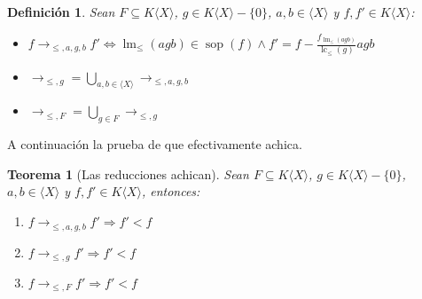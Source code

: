 \documentclass[12pt]{report}
\theoremstyle{customstyle}
\newtheorem{definition}{Definición}[chapter]
\newtheorem{theorem}{Teorema}[chapter]
\theoremstyle{factstyle}
\DeclareMathOperator{\sop}{sop}
\DeclareMathOperator{\lm}{lm}
\DeclareMathOperator{\lc}{lc}
\begin{document}
\begin{definition}
  Sean $F ⊆ K⟨X⟩$, $g ∈ K⟨X⟩ - \{0\}$, $a, b ∈ ⟨X⟩$ y $f, f' ∈ K⟨X⟩$:
  \begin{itemize}
    \item $f →_{≤, a, g, b} f' ⇔ \lm_≤(agb) ∈ \sop(f) ∧ f' = f - \frac{f_{\lm_≤(agb)}}{\lc_≤(g)}agb$
    \item $→_{≤, g} = ⋃_{a, b ∈ ⟨X⟩} →_{≤, a, g, b}$
    \item $→_{≤, F} = ⋃_{g ∈ F} →_{≤, g}$
  \end{itemize}
\end{definition}

A continuación la prueba de que efectivamente achica.

\begin{theorem}[Las reducciones achican]\label{thm:→ achican}
  Sean $F ⊆ K⟨X⟩$, $g ∈ K⟨X⟩ - \{0\}$, $a, b ∈ ⟨X⟩$ y $f, f' ∈ K⟨X⟩$, entonces:
  \begin{enumerate}
    \item $f →_{≤, a, g, b} f' ⇒ f' < f$
    \item $f →_{≤, g} f' ⇒ f' < f$
    \item $f →_{≤, F} f' ⇒ f' < f$
  \end{enumerate}
\end{theorem}
\end{document}

